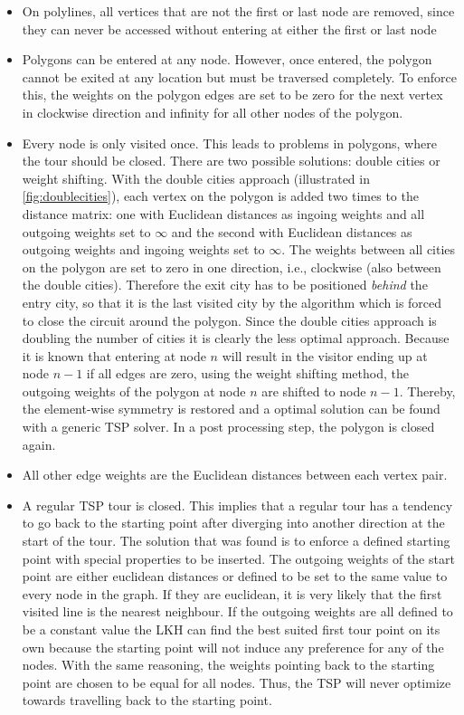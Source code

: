 \begin{itemize}
\item On polylines, all vertices that are not the first or last node are removed, since they can never be accessed without entering at either the first or last node 
\item Polygons can be entered at any node. However, once entered, the polygon cannot be exited at any location but must be traversed completely. To enforce this, the weights on the polygon edges are set to be zero for the next vertex in clockwise direction and infinity for all other nodes of the polygon.
\item Every node is only visited once. This leads to problems in polygons, where the tour should be closed. There are two possible solutions: double cities or weight shifting. With the double cities approach (illustrated in \autoref{fig:doublecities}), each vertex on the polygon is added two times to the distance matrix: one with Euclidean distances as ingoing weights and all outgoing weights set to $\infty$ and the second with Euclidean distances as outgoing weights and ingoing weights set to $\infty$. The weights between all cities on the polygon are set to zero in one direction, i.e., clockwise (also between the double cities). Therefore the exit city has to be positioned \textit{behind} the entry city, so that it is the last visited city by the algorithm which is forced to close the circuit around the polygon. Since the double cities approach is doubling the number of cities it is clearly the less optimal approach. Because it is known that entering at node $n$ will result in the visitor ending up at node $n-1$ if all edges are zero, using the weight shifting method, the outgoing weights of the polygon at node $n$ are shifted to node $n-1$. Thereby, the element-wise symmetry is restored and a optimal solution can be found with a generic TSP solver. In a post processing step, the polygon is closed again.
\item All other edge weights are the Euclidean distances between each vertex pair.
\item A regular TSP tour is closed. This implies that a regular tour has a tendency to go back to the starting point after diverging into another direction at the start of the tour. The solution that was found is to enforce a defined starting point with special properties to be inserted. The outgoing weights of the start point are either euclidean distances or defined to be set to the same value to every node in the graph. If they are euclidean, it is very likely that the first visited line is the nearest neighbour. If the outgoing weights are all defined to be a constant value the LKH can find the best suited first tour point on its own because the starting point will not induce any preference for any of the nodes.
With the same reasoning, the weights pointing back to the starting point are chosen to be equal for all nodes. Thus, the TSP will never optimize towards travelling back to the starting point.
\end{itemize}

